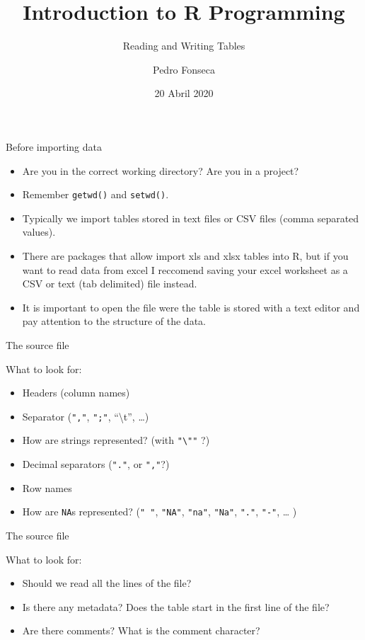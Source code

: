 \documentclass[ignorenonframetext,]{beamer}
\title{Introduction to R Programming}
\subtitle{Reading and Writing Tables}
\author{Pedro Fonseca}
\date{20 Abril 2020}
\begin{document}
\frame{\titlepage}

\begin{frame}[fragile]{Before importing data}
\protect\hypertarget{before-importing-data}{}

\begin{itemize}
\item
  Are you in the correct working directory? Are you in a project?
\item
  Remember \texttt{getwd()} and \texttt{setwd()}.
\item
  Typically we import tables stored in text files or CSV files (comma
  separated values).
\item
  There are packages that allow import xls and xlsx tables into R, but
  if you want to read data from excel I reccomend saving your excel
  worksheet as a CSV or text (tab delimited) file instead.
\item
  It is important to open the file were the table is stored with a text
  editor and pay attention to the structure of the data.
\end{itemize}

\end{frame}

\begin{frame}[fragile]{The source file}
\protect\hypertarget{the-source-file}{}

What to look for:

\begin{itemize}
\item
  Headers (column names)
\item
  Separator (\texttt{","}, \texttt{";"}, ``\textbackslash{}t'',
  \ldots{})
\item
  How are strings represented? (with \texttt{"\textbackslash{}""} ?)
\item
  Decimal separators (\texttt{"."}, or \texttt{","}?)
\item
  Row names
\item
  How are \texttt{NA}s represented? (\texttt{"\ "}, \texttt{"NA"},
  \texttt{"na"}, \texttt{"Na"}, \texttt{"."}, \texttt{"-"}, \ldots{} )
\end{itemize}

\end{frame}

\begin{frame}{The source file}
\protect\hypertarget{the-source-file-1}{}

What to look for:

\begin{itemize}
\item
  Should we read all the lines of the file?
\item
  Is there any metadata? Does the table start in the first line of the
  file?
\item
  Are there comments? What is the comment character?
\end{itemize}

\end{frame}
\end{document}
